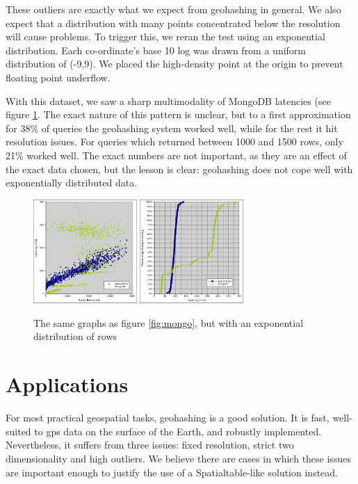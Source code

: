 \documentclass[11pt]{article}
\begin{document}
These outliers are exactly what we expect from geohashing in general.  We also expect that a distribution with many points concentrated below the resolution will cause problems.  To trigger this, we reran the test using an exponential distribution.  Each co-ordinate's base 10 log was drawn from a uniform distribution of (-9,9).  We placed the high-density point at the origin to prevent floating point underflow.

With this dataset, we saw a sharp multimodality of MongoDB latencies (see figure \ref{fig:mongoexp}.  The exact nature of this pattern is unclear, but to a first approximation for 38\% of queries the geohashing system worked well, while for the rest it hit resolution issues.  For queries which returned between 1000 and 1500 rows, only 21\% worked well.  The exact numbers are not important, as they are an effect of the exact data chosen, but the lesson is clear: geohashing does not cope well with exponentially distributed data.

\begin{figure}[h]
\includegraphics[width=1.55in]{st_mongo_exp}
\includegraphics[width=1.55in]{st_mongo_exp_cumu}
\caption{The same graphs as figure \ref{fig:mongo}, but with an exponential distribution of rows}
\label{fig:mongoexp}
\end{figure}

\section{Applications}

For most practical geospatial tasks, geohashing is a good solution.  It is fast, well-suited to gps data on the surface of the Earth, and robustly implemented.  Nevertheless, it suffers from three issues: fixed resolution, strict two dimensionality and high outliers.  We believe there are cases in which these issues are important enough to justify the use of a Spatialtable-like solution instead.
\end{document}
